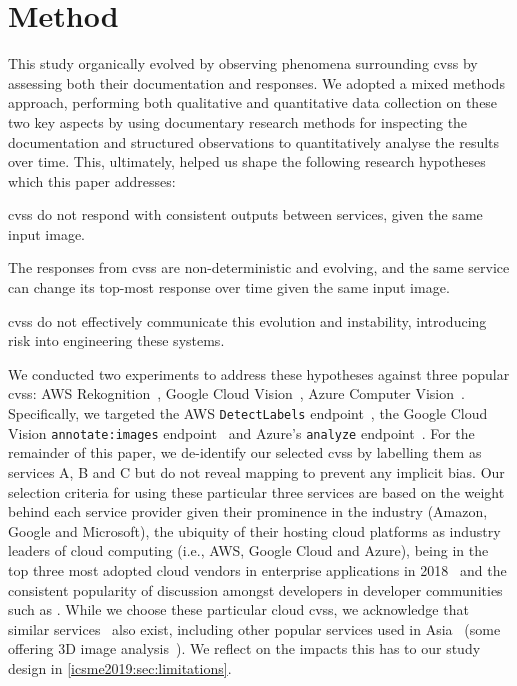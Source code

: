 \section{Method}
\label{icsme2019:sec:method}

This study organically evolved by observing phenomena surrounding \glspl{cvs} by assessing both their documentation and responses. We adopted a mixed methods approach, performing both qualitative and quantitative data collection on these two key aspects by using documentary research methods for inspecting the documentation and structured observations to quantitatively analyse the results over time. This, ultimately, helped us shape the following research hypotheses which this paper addresses:

\begin{enumerate}[label=\textbf{[RH\arabic*]}, leftmargin=2\parindent]
\item \glspl{cvs} do not respond with consistent outputs between services, given the same input image.
\item The responses from \glspl{cvs} are non-deterministic and evolving, and the same service can change its top-most response over time given the same input image.
\item \glspl{cvs} do not effectively communicate this evolution and instability, introducing risk into engineering these systems.
\end{enumerate}

We conducted two experiments to address these hypotheses against three popular \glspl{cvs}: AWS Rekognition~, Google Cloud Vision~, Azure Computer Vision~. Specifically, we targeted the AWS \texttt{DetectLabels} endpoint~, the Google Cloud Vision \texttt{annotate:images} endpoint~ and Azure's \texttt{analyze} endpoint~. For the remainder of this paper, we de-identify our selected \glspl{cvs} by labelling them as services A, B and C but do not reveal mapping to prevent any implicit bias.
Our selection criteria for using these particular three services are based on the weight behind each service provider given their prominence in the industry (Amazon, Google and Microsoft), the ubiquity of their hosting cloud platforms as industry leaders of cloud computing (i.e., AWS, Google Cloud and Azure), being in the top three most adopted cloud vendors in enterprise applications in 2018~\citep{RightScaleInc:2018kJ} and the consistent popularity of discussion amongst developers in developer communities such as . While we choose these particular cloud \glspl{cvs}, we  acknowledge that similar services~ also exist, including other popular services used in Asia~ (some offering 3D image analysis~). We reflect on the impacts this has to our study design in \cref{icsme2019:sec:limitations}.

